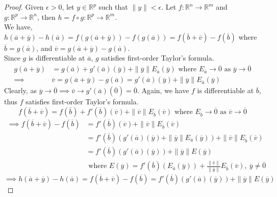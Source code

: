 \begin{proof}
	Given $\epsilon > 0$, let $y \in \mathbb{R}^p$ such that $\|y\| < \epsilon$.
	Let $f : \mathbb{R}^n \to \mathbb{R}^m$ and $g : \mathbb{R}^p \to \mathbb{R}^n$, then $h = f \circ g : \mathbb{R}^p \to \mathbb{R}^m$.\\

	We have, $h(\overline{a}+\overline{y})-h(\overline{a}) = f(g(\overline{a}+\overline{y})) - f(g(\overline{a})) = f(\overline{b}+\overline{v}) - f(\overline{b})$ where $\overline{b} = g(\overline{a})$, and  $\overline{v} = g(\overline{a}+\overline{y})-g(\overline{a})$.\\

	Since $g$ is differentiable at $\overline{a}$, $g$ satisfies first-order Taylor's formula.
	\begin{align*}
		g(\overline{a}+\overline{y}) & =  g(\overline{a}) + g'(\overline{a})(\overline{y}) + \|\overline{y}\| E_{\overline{a}}(\overline{y}) \text{ where } E_{\overline{a}} \to \overline{0} \text{ as } \overline{y} \to \overline{0} \\
		\implies & \overline{v} = g(\overline{a}+\overline{y})-g(\overline{a}) = g'(\overline{a})(\overline{y}) + \|\overline{y}\| E_{\overline{a}}(\overline{y})
	\end{align*}
	Clearly, as $\overline{y} \to \overline{0} \implies \overline{v} \to g'(\overline{a})(\overline{0}) = \overline{0}$.
	Again,  we have $f$ is differentiable at $\overline{b}$, thus $f$ satisfies first-order Taylor's formula.
	\[ f(\overline{b}+\overline{v}) = f(\overline{b}) + f'(\overline{b})(\overline{v}) + \|\overline{v}\| E_{\overline{b}}(\overline{v}) \text{ where } E_{\overline{b}} \to \overline{0} \text{ as } \overline{v} \to \overline{0} \]
	\begin{align*}
		\implies f(\overline{b}+\overline{v}) - f(\overline{b}) & = f'(\overline{b})(\overline{v}) + \|\overline{v}\| E_{\overline{b}}(\overline{v}) \\
		& = f'(\overline{b})\left( g'(\overline{a})(\overline{y}) + \|\overline{y}\|E_{\overline{a}}(\overline{y}) \right) + \|\overline{v}\| E_{\overline{b}}(\overline{v}) \\
		& = f'(\overline{b})(g'(\overline{a})(\overline{y})) + \|\overline{y}\| E(\overline{y}) \\
		& \text{ where } E(\overline{y}) = f'(\overline{b})(E_{\overline{a}}(\overline{y})) + \frac{\|\overline{v}\|}{\|\overline{y}\|} E_{\overline{b}}(\overline{v}),\ \overline{y} \ne \overline{0}
	\end{align*}
	\[ \implies h(\overline{a}+\overline{y})-h(\overline{a}) = f(\overline{b}+\overline{v}) - f(\overline{b}) = f'(\overline{b})(g'(\overline{a})(\overline{y})) + \|\overline{y}\|E(\overline{y}) \]


\end{proof}
